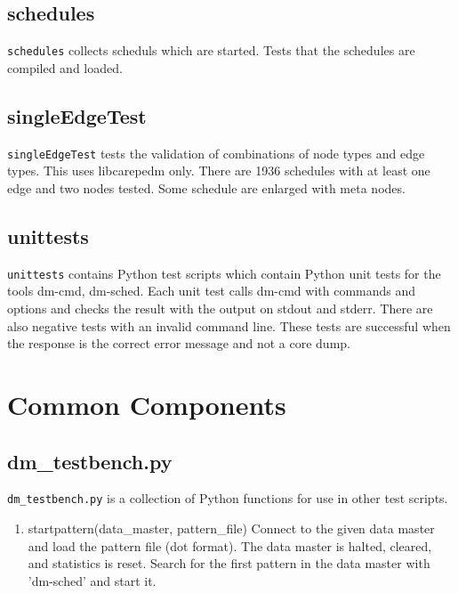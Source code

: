 \documentclass[12pt,a4paper]{report}
\begin{document}
\section{schedules}
\texttt{schedules} collects scheduls which are started. Tests that the schedules are compiled and loaded.
\section{singleEdgeTest}
\texttt{singleEdgeTest} tests the validation of combinations of node types and edge types. This uses libcarepedm only. There are 1936 schedules 
with at least one edge and two nodes tested. Some schedule are enlarged with meta nodes. 
\section{unittests}
\texttt{unittests} contains Python test scripts which contain Python unit tests for the tools dm-cmd, dm-sched. Each unit test calls dm-cmd 
with commands and options and checks the result with the output on stdout and stderr. There are also negative tests with an invalid command 
line. These tests are successful when the response is the correct error message and not a core dump.
\chapter{Common Components}
\section{dm\_testbench.py}
\texttt{dm\_testbench.py} is a collection of Python functions for use in other test scripts.
\begin{enumerate}
\item startpattern(data\_master, pattern\_file)
    Connect to the given data master and load the pattern file (dot format).
    The data master is halted, cleared, and statistics is reset.
    Search for the first pattern in the data master with 'dm-sched' and start it.
\end{enumerate}
\end{document}
